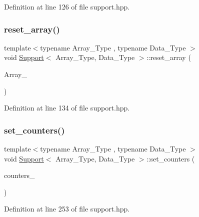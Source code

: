 Definition at line 126 of file support.\+hpp.

\mbox{\label{class_support_a4b3c832b8a6e84638ff89f346d0454cf}} 
\subsubsection{\texorpdfstring{reset\+\_\+array()}{reset\_array()}\hspace{0.1cm}{\footnotesize\ttfamily [2/2]}}
{\footnotesize\ttfamily template$<$typename Array\+\_\+\+Type , typename Data\+\_\+\+Type $>$ \\
void \hyperlink{class_support}{Support}$<$ Array\+\_\+\+Type, Data\+\_\+\+Type $>$\+::reset\+\_\+array (\begin{DoxyParamCaption}\item[{const Array\+\_\+\+Type $\ast$}]{Array\+\_\+ }\end{DoxyParamCaption})\hspace{0.3cm}{\ttfamily [inline]}}



Definition at line 134 of file support.\+hpp.

\mbox{\label{class_support_a6933478f6329793a6216e0326e79dff3}} 
\subsubsection{\texorpdfstring{set\+\_\+counters()}{set\_counters()}}
{\footnotesize\ttfamily template$<$typename Array\+\_\+\+Type , typename Data\+\_\+\+Type $>$ \\
void \hyperlink{class_support}{Support}$<$ Array\+\_\+\+Type, Data\+\_\+\+Type $>$\+::set\+\_\+counters (\begin{DoxyParamCaption}\item[{\hyperlink{class_counter_vector}{Counter\+Vector}$<$ Array\+\_\+\+Type, Data\+\_\+\+Type $>$ $\ast$}]{counters\+\_\+ }\end{DoxyParamCaption})\hspace{0.3cm}{\ttfamily [inline]}}



Definition at line 253 of file support.\+hpp.



